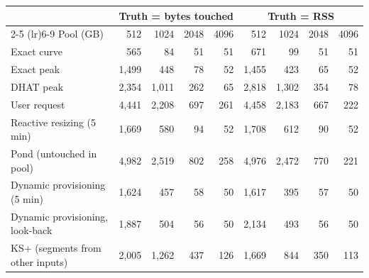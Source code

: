 \begin{tabular}{lrrrrrrrr}
\toprule
 & \multicolumn{4}{c}{Truth = bytes touched} & \multicolumn{4}{c}{Truth = RSS} \\
\cmidrule(lr){2-5} \cmidrule(lr){6-9}
Pool (GB) & 512 & 1024 & 2048 & 4096 & 512 & 1024 & 2048 & 4096 \\
\midrule
Exact curve & 565 & 84 & 51 & 51 & 671 & 99 & 51 & 51 \\
Exact peak & 1{,}499 & 448 & 78 & 52 & 1{,}455 & 423 & 65 & 52 \\
DHAT peak & 2{,}354 & 1{,}011 & 262 & 65 & 2{,}818 & 1{,}302 & 354 & 78 \\
User request & 4{,}441 & 2{,}208 & 697 & 261 & 4{,}458 & 2{,}183 & 667 & 222 \\
Reactive resizing (5 min) & 1{,}669 & 580 & 94 & 52 & 1{,}708 & 612 & 90 & 52 \\
Pond (untouched in pool) & 4{,}982 & 2{,}519 & 802 & 258 & 4{,}976 & 2{,}472 & 770 & 221 \\
Dynamic provisioning (5 min) & 1{,}624 & 457 & 58 & 50 & 1{,}617 & 395 & 57 & 50 \\
Dynamic provisioning, look-back & 1{,}887 & 504 & 56 & 50 & 2{,}134 & 493 & 56 & 50 \\
KS+ (segments from other inputs) & 2{,}005 & 1{,}262 & 437 & 126 & 1{,}669 & 844 & 350 & 113 \\
\bottomrule
\end{tabular}
